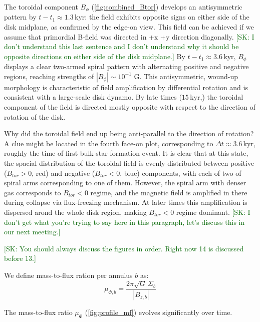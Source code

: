 \documentclass[twocolumn]{openjournal}
\newcommand{\kyr}{\,\mathrm{kyr}}
\newcommand{\tform}{t_1}
\newcommand{\skcomment}[1]{{\textcolor{darkgreen}{[SK: #1]}}}
\begin{document}
The toroidal component $B_\phi$ (\autoref{fig:combined_Btor}) develops
an antisymmetric pattern by $t - \tform \approx 1.3\kyr$:
the field exhibits opposite signs on either side of the disk midplane,
as confirmed by the edge-on view.
This field can be achieved if we assume that primordial B-field
was directed in +x +y direction diagonally. \skcomment{I don't understand this last sentence and I don't understand why it should be opposite directions on either side of the disk midplane.}
By $t - \tform \approx 3.6\kyr$, $B_\phi$ displays a clear
two-armed spiral pattern with alternating positive and negative
regions, reaching strengths of $|B_\phi| \sim 10^{-1}$ G.
This antisymmetric, wound-up morphology is characteristic of field
amplification by differential rotation and is consistent with
a large-scale disk dynamo. By late times ($15\kyr$,) the toroidal
component of the field is directed mostly opposite with respect to the
direction of rotation of the disk.

Why did the toroidal field end up being anti-parallel to the direction of
rotation? A clue might be located in the fourth face-on plot,
corresponding to $\Delta t \approx 3.6\kyr$, roughly the time of first
bulk star formation event.
It is clear that at this state, the spacial distribution of the toroidal field
is evenly distributed between positive ($B_{tor} > 0$, red) and negative
($B_{tor} < 0$, blue) components, with each of two of spiral arms corresponding
to one of them. However, the spiral arm with denser gas corresponds to
$B_{tor} < 0$ regime, and the magnetic field is amplified in there during
collapse via flux-freezing mechanism. At later times this amplification is
dispersed arond the whole disk region, making $B_{tor} < 0$ regime dominant. \skcomment{I don't get what you're trying to say here in this paragraph, let's discuss this in our next meeting.}


\skcomment{You should always discuss the figures in order. Right now 14 is discussed before 13.}

We define mass-to-flux ration per annulus $b$ as:
\begin{equation}
	\mu_{\Phi,b} = \frac{2\pi\sqrt{G}\,\Sigma_b}{|B_{z,b}|}
\end{equation}

The mass-to-flux ratio $\mu_\Phi$ (\autoref{fig:profile_mf})
evolves significantly over time.
\end{document}
